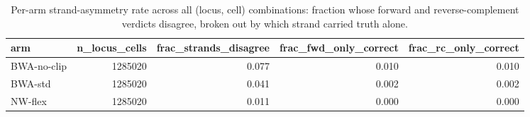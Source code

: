 \begin{table}
\caption{Per-arm strand-asymmetry rate across all (locus, cell) combinations: fraction whose forward and reverse-complement verdicts disagree, broken out by which strand carried truth alone.}
\label{tab:compound-strand-asymmetry}
\begin{tabular}{lrrrr}
\toprule
arm & n_locus_cells & frac_strands_disagree & frac_fwd_only_correct & frac_rc_only_correct \\
\midrule
BWA-no-clip & 1285020 & 0.077 & 0.010 & 0.010 \\
BWA-std & 1285020 & 0.041 & 0.002 & 0.002 \\
NW-flex & 1285020 & 0.011 & 0.000 & 0.000 \\
\bottomrule
\end{tabular}
\end{table}
